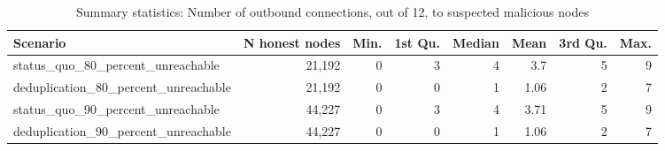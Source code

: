 \begin{table}[t]
\caption{
{Summary statistics: Number of outbound connections, out of 12, to suspected malicious nodes}
} 
\begin{tabular*}{\linewidth}{@{\extracolsep{\fill}}lrrrrrrr}
\toprule
Scenario & N honest nodes & Min. & 1st Qu. & Median & Mean & 3rd Qu. & Max. \\ 
\midrule\addlinespace[2.5pt]
status\_quo\_80\_percent\_unreachable & 21,192 & 0 & 3 & 4 & 3.7 & 5 & 9 \\ 
deduplication\_80\_percent\_unreachable & 21,192 & 0 & 0 & 1 & 1.06 & 2 & 7 \\ 
status\_quo\_90\_percent\_unreachable & 44,227 & 0 & 3 & 4 & 3.71 & 5 & 9 \\ 
deduplication\_90\_percent\_unreachable & 44,227 & 0 & 0 & 1 & 1.06 & 2 & 7 \\ 
\bottomrule
\end{tabular*}
\label{table-malicious-connection-summary}
\end{table}
